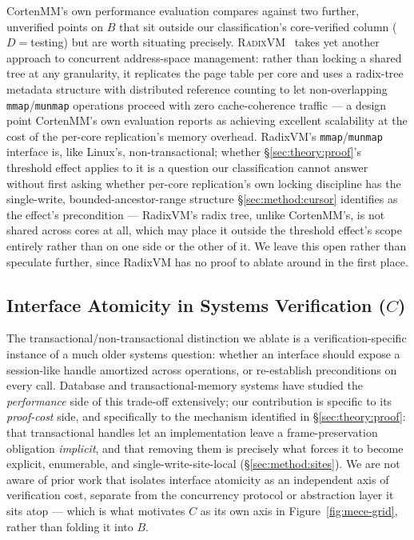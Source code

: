 \documentclass[10pt]{article}
\newcommand{\vfn}[1]{\texttt{#1}}
\begin{document}
CortenMM's own performance evaluation compares against two further,
unverified points on $B$ that sit outside our classification's
core-verified column ($D{=}$testing) but are worth situating precisely.
\textsc{RadixVM}~\cite{radixvm} takes yet another approach to
concurrent address-space management: rather than locking a shared
tree at any granularity, it replicates the page table per core and
uses a radix-tree metadata structure with distributed reference
counting to let non-overlapping \vfn{mmap}/\vfn{munmap} operations
proceed with zero cache-coherence traffic --- a design point
CortenMM's own evaluation reports as achieving excellent scalability
at the cost of the per-core replication's memory overhead. RadixVM's
\vfn{mmap}/\vfn{munmap} interface is, like Linux's, non-transactional;
whether \S\ref{sec:theory:proof}'s threshold effect applies to it is a
question our classification cannot answer without first asking whether
per-core replication's own locking discipline has the single-write,
bounded-ancestor-range structure \S\ref{sec:method:cursor} identifies
as the effect's precondition --- RadixVM's radix tree, unlike
CortenMM's, is not shared across cores at all, which may place it
outside the threshold effect's scope entirely rather than on one side
or the other of it. We leave this open rather than speculate further,
since RadixVM has no proof to ablate around in the first place.

\subsection{Interface Atomicity in Systems Verification ($C$)}
\label{sec:related:atomicity}

The transactional/non-transactional distinction we ablate is a
verification-specific instance of a much older systems question:
whether an interface should expose a session-like handle amortized
across operations, or re-establish preconditions on every call.
Database and transactional-memory systems have studied the
\emph{performance} side of this trade-off extensively; our contribution
is specific to its \emph{proof-cost} side, and specifically to the
mechanism identified in \S\ref{sec:theory:proof}: that transactional
handles let an implementation leave a frame-preservation obligation
\emph{implicit}, and that removing them is precisely what forces it to
become explicit, enumerable, and single-write-site-local
(\S\ref{sec:method:sites}). We are not aware of prior work that
isolates interface atomicity as an independent axis of verification
cost, separate from the concurrency protocol or abstraction layer it
sits atop --- which is what motivates $C$ as its own axis in
Figure~\ref{fig:mece-grid}, rather than folding it into $B$.
\end{document}
